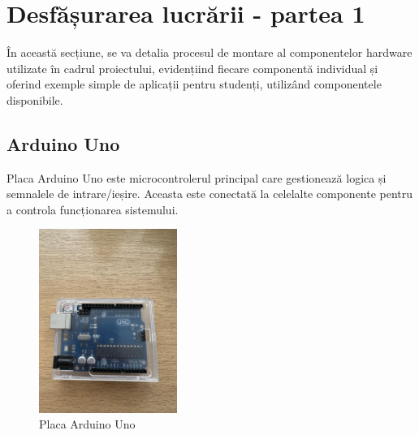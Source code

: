 \documentclass{report}
\begin{document}
\chapter{Desfășurarea lucrării - partea 1}

În această secțiune, se va detalia procesul de montare al componentelor hardware utilizate în cadrul proiectului, evidențiind fiecare componentă individual și oferind exemple simple de aplicații pentru studenți, utilizând componentele disponibile.

\section{Arduino Uno}
Placa Arduino Uno este microcontrolerul principal care gestionează logica și semnalele de intrare/ieșire. Aceasta este conectată la celelalte componente pentru a controla funcționarea sistemului.

\begin{figure}[H]
    \centering
    \includegraphics[width=0.4\textwidth]{arduino.jpg}
    \caption{Placa Arduino Uno}
    \label{fig:arduino}
\end{figure}
\newpage
\vspace*{1cm}
\end{document}
